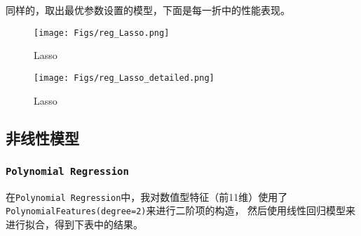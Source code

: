 \documentclass[12pt, a4paper, oneside]{ctexart}
\begin{document}
同样的，取出最优参数设置的模型，下面是每一折中的性能表现。

\begin{figure}[H]
    \centering
    \texttt{[image: Figs/reg\_Lasso.png]}
    \caption{Lasso}
\end{figure}

\begin{figure}[H]
    \centering
    \texttt{[image: Figs/reg\_Lasso\_detailed.png]}
    \caption{Lasso}
\end{figure}

\subsection{非线性模型}

\subsubsection{\texttt{Polynomial Regression}}
在\texttt{Polynomial Regression}中，我对数值型特征（前11维）使用了\texttt{PolynomialFeatures(degree=2)}来进行二阶项的构造，
然后使用线性回归模型来进行拟合，得到下表中的结果。
\end{document}
